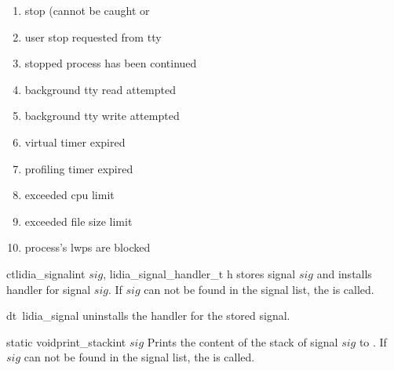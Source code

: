 \begin{enumerate}
 \item {} stop (cannot be caught or
 \item {} user stop requested from tty
 \item {} stopped process has been continued
 \item {} background tty read attempted
 \item {} background tty write attempted
 \item {} virtual timer expired
 \item {} profiling timer expired
 \item {} exceeded cpu limit
 \item {} exceeded file size limit
 \item {} process's lwps are blocked
\end{enumerate}



\CONS

\begin{fcode}{ct}{lidia_signal}{int $\mathit{sig}$, lidia_signal_handler_t h}
  stores signal $\mathit{sig}$ and installs handler  for signal $\mathit{sig}$.  If
  $\mathit{sig}$ can not be found in the signal list, the \LEH is called.
\end{fcode}

\begin{fcode}{dt}{~lidia_signal}{}
  uninstalls the handler for the stored signal.
\end{fcode}



\BASIC

\begin{fcode}{static void}{print_stack}{int $\mathit{sig}$}
  Prints the content of the stack of signal $\mathit{sig}$ to .  If $\mathit{sig}$
  can not be found in the signal list, the \LEH is called.
\end{fcode}




\EXAMPLES

